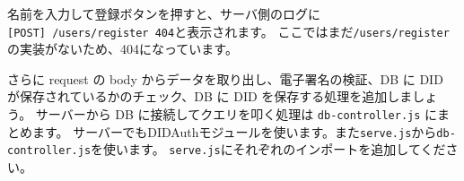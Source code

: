 \begin{Shaded}
\begin{Highlighting}[]
\NormalTok{(}\KeywordTok{=\textgreater{}}\NormalTok{ \{}
  \OperatorTok{=}  \NormalTok{)}\OperatorTok{;}
  \OperatorTok{;}

   \OperatorTok{===}  \OperatorTok{\&\&}\OperatorTok{===} \NormalTok{) \{}
\NormalTok{  \}}
\NormalTok{\})}\OperatorTok{;}
\end{Highlighting}
\end{Shaded}

名前を入力して登録ボタンを押すと、サーバ側のログに\texttt{{[}POST{]}\ /users/register\ 404}と表示されます。
ここではまだ\texttt{/users/register}の実装がないため、404になっています。

さらに request の body からデータを取り出し、電子署名の検証、DB に DID
が保存されているかのチェック、DB に DID を保存する処理を追加しましょう。
サーバーから DB に接続してクエリを叩く処理は \texttt{db-controller.js}
にまとめます。
サーバーでもDIDAuthモジュールを使います。また\texttt{serve.js}から\texttt{db-controller.js}を使います。
\texttt{serve.js}にそれぞれのインポートを追加してください。

\begin{Shaded}
\begin{Highlighting}[]
 \OperatorTok{;}
\OperatorTok{,} \OperatorTok{;}
\end{Highlighting}
\end{Shaded}

